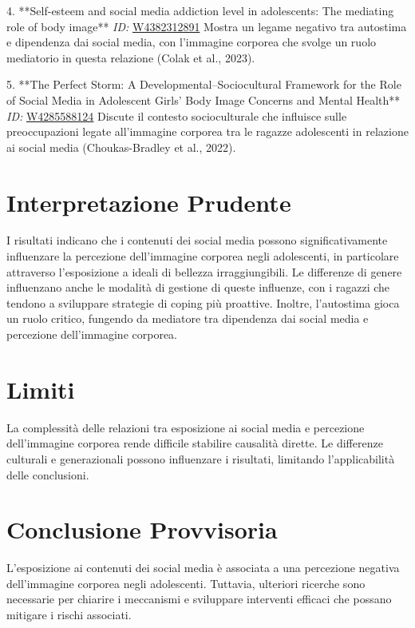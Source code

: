 \documentclass{article}
\begin{document}
4. **Self-esteem and social media addiction level in adolescents: The mediating role of body image**  
   \textit{ID:} \href{https://openalex.org/W4382312891}{W4382312891}  
   Mostra un legame negativo tra autostima e dipendenza dai social media, con l'immagine corporea che svolge un ruolo mediatorio in questa relazione (Colak et al., 2023).

5. **The Perfect Storm: A Developmental–Sociocultural Framework for the Role of Social Media in Adolescent Girls’ Body Image Concerns and Mental Health**  
   \textit{ID:} \href{https://openalex.org/W4285588124}{W4285588124}  
   Discute il contesto socioculturale che influisce sulle preoccupazioni legate all'immagine corporea tra le ragazze adolescenti in relazione ai social media (Choukas-Bradley et al., 2022).

\section{Interpretazione Prudente}
I risultati indicano che i contenuti dei social media possono significativamente influenzare la percezione dell'immagine corporea negli adolescenti, in particolare attraverso l'esposizione a ideali di bellezza irraggiungibili. Le differenze di genere influenzano anche le modalità di gestione di queste influenze, con i ragazzi che tendono a sviluppare strategie di coping più proattive. Inoltre, l'autostima gioca un ruolo critico, fungendo da mediatore tra dipendenza dai social media e percezione dell'immagine corporea.

\section{Limiti}
La complessità delle relazioni tra esposizione ai social media e percezione dell'immagine corporea rende difficile stabilire causalità dirette. Le differenze culturali e generazionali possono influenzare i risultati, limitando l'applicabilità delle conclusioni.

\section{Conclusione Provvisoria}
L'esposizione ai contenuti dei social media è associata a una percezione negativa dell'immagine corporea negli adolescenti. Tuttavia, ulteriori ricerche sono necessarie per chiarire i meccanismi e sviluppare interventi efficaci che possano mitigare i rischi associati.
\end{document}
